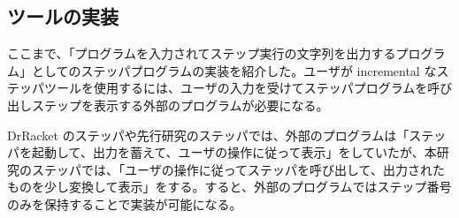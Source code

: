 \subsection{ツールの実装}

ここまで、「プログラムを入力されてステップ実行の文字列を出力するプログラム」としてのステッパプログラムの実装を紹介した。ユーザが incremental なステッパツールを使用するには、ユーザの入力を受けてステッパプログラムを呼び出しステップを表示する外部のプログラムが必要になる。

DrRacket のステッパ\cite{clements01}や先行研究のステッパ\cite{FCA19}では、外部のプログラムは「ステッパを起動して、出力を蓄えて、ユーザの操作に従って表示」をしていたが、本研究のステッパでは、「ユーザの操作に従ってステッパを呼び出して、出力されたものを少し変換して表示」をする。すると、外部のプログラムではステップ番号のみを保持することで実装が可能になる。
